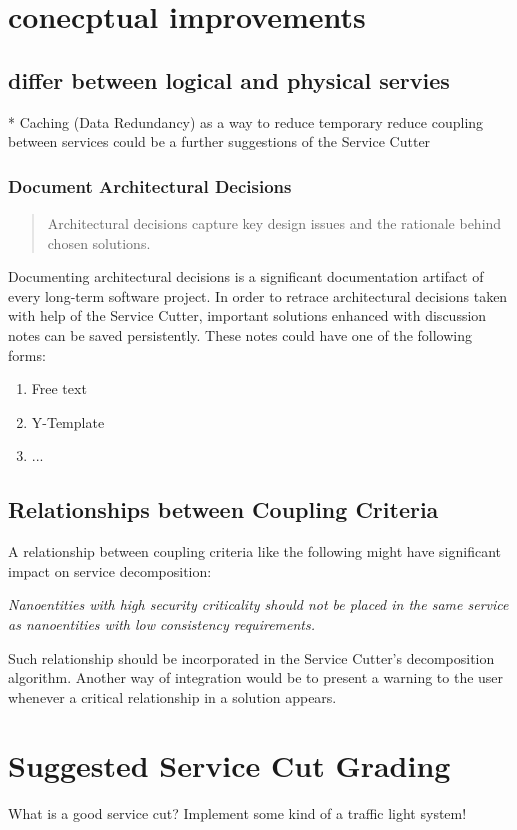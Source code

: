 \section{conecptual improvements}

\subsection{differ between logical and physical servies}

* Caching (Data Redundancy) as a way to reduce temporary reduce coupling between services could be a further suggestions of the Service Cutter

\subsubsection{Document Architectural Decisions}

\begin{quote}
	Architectural decisions capture key design issues and the rationale behind chosen solutions.\cite{zioAD}
\end{quote}

Documenting architectural decisions is a significant documentation artifact of every long-term software project. In order to retrace architectural decisions taken with help of the Service Cutter, important solutions enhanced with discussion notes can be saved persistently. These notes could have one of the following forms:

\begin{enumerate}
	\item Free text
	\item Y-Template\cite{zimmermann2012yTemplate}
	\item ... %
\end{enumerate}

\subsection{Relationships between Coupling Criteria}

A relationship between coupling criteria like the following might have significant impact on service decomposition:

\textit{Nanoentities with high security criticality should not be placed in the same service as nanoentities with low consistency requirements.}

Such relationship should be incorporated in the Service Cutter's decomposition algorithm. Another way of integration would be to present a warning to the user whenever a critical relationship in a solution appears.

\section{Suggested Service Cut Grading}
\label{sec:suggested-cut-grades}

What is a good service cut? Implement some kind of a traffic light system!





